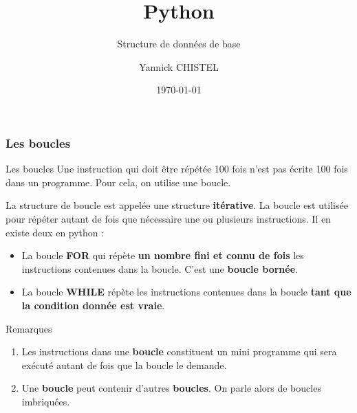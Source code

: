 \documentclass[8pt]{beamer}
\title{Python}
\subtitle{Structure de données de base}
\author{Yannick CHISTEL}
\institute{Lycée Dumont d'Urville - CAEN}
\date{\today}
\newcounter{num}
\begin{document}
 
\frame{\titlepage}

\begin{frame}
\frametitle{Les boucles}

\begin{block}{Les boucles}
Une instruction qui doit être répétée 100 fois n'est pas écrite 100 fois dans un programme. Pour cela, on utilise une boucle.\medskip

La structure de boucle est appelée une structure \textbf{itérative}. La boucle est utilisée pour répéter autant de fois que nécessaire une ou plusieurs instructions. Il en existe deux en python :
\begin{itemize}
\item La boucle \textbf{FOR} qui répète \textbf{un nombre fini et connu de fois} les instructions contenues dans la boucle. C'est une \textbf{boucle bornée}.
\item La boucle \textbf{WHILE} répète les instructions contenues dans la boucle \textbf{tant que la condition donnée est vraie}.
\end{itemize}
\end{block}

\begin{alertblock}{Remarques}
\begin{enumerate}
\item Les instructions dans une \textbf{boucle} constituent un mini programme qui sera exécuté autant de fois que la boucle le demande.
\item Une \textbf{boucle} peut contenir d'autres \textbf{boucles}. On parle alors de boucles imbriquées.
\end{enumerate}
\end{alertblock}

\end{frame}
\end{document}
